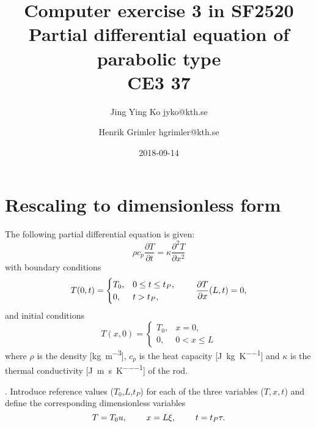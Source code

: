 \documentclass{article}
\date{2018-09-14}
\author{Jing Ying Ko jyko@kth.se 
\and Henrik Grimler hgrimler@kth.se}
\title{Computer exercise 3 in SF2520 \\Partial differential equation of parabolic type \\CE3 37 }
\begin{document}
\maketitle
\section{Rescaling to dimensionless form}

The following partial differential equation is given:
\begin{equation} \label{eq1}
\rho c_p \frac{\partial T}{\partial t} = \kappa \frac{\partial^2 T}{\partial x^2}
\end{equation}
with boundary conditions
\begin{equation} \label{eq1}
   T(0,t)= 
\begin{cases}
    T_0,           & 0 \leq t \leq t_P, \\
    0,              & t > t_P,
\end{cases}
   \hspace{0.8cm}         \frac{\partial T}{\partial x}(L,t)=0,
\end{equation}
and initial conditions
\begin{equation} \label{eq1}
   T(x,0)= 
\begin{cases}
    T_0,           & x=0, \\
    0,              & 0 < x \leq L
\end{cases}
\end{equation}
where $\rho$ is the density [\si{\kilo\gram\per\meter\cubed}], $c_p$ is the
heat capacity [\si{\joule\per\kilo\gram\per\kelvin}] and
$\kappa$ is the thermal conductivity [\si{\joule\per\meter\per\second\per\kelvin}] of the rod.
\newline

. Introduce reference values ($T_0$,$L$,$t_P$) for each of the three variables ($T,x,t$) and define the corresponding dimensionless variables
\begin{equation}
    T = T_0 u, \hspace{0.8cm} x = L \xi, \hspace{0.8cm} t = t_P \tau.
\end{equation}
\end{document}
